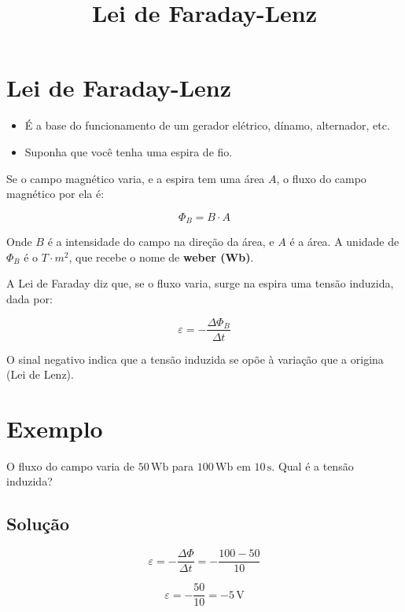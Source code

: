 \documentclass[a4paper,12pt]{article}
\title{Lei de Faraday-Lenz}
\author{}
\date{}
\begin{document}
\maketitle

\section*{Lei de Faraday-Lenz}

\begin{itemize}
    \item É a base do funcionamento de um gerador elétrico, dínamo, alternador, etc.
    \item Suponha que você tenha uma espira de fio.
\end{itemize}

Se o campo magnético varia, e a espira tem uma área $A$, o fluxo do campo magnético por ela é:

\[
\Phi_B = B \cdot A
\]

Onde $B$ é a intensidade do campo na direção da área, e $A$ é a área.  
A unidade de $\Phi_B$ é o $T \cdot m^2$, que recebe o nome de \textbf{weber (Wb)}.

A Lei de Faraday diz que, se o fluxo varia, surge na espira uma tensão induzida, dada por:

\[
\varepsilon = - \frac{\Delta \Phi_B}{\Delta t}
\]

O sinal negativo indica que a tensão induzida se opõe à variação que a origina (Lei de Lenz).

\section*{Exemplo}

O fluxo do campo varia de $50\,\text{Wb}$ para $100\,\text{Wb}$ em $10\,\text{s}$.  
Qual é a tensão induzida?

\subsection*{Solução}

\[
\varepsilon = -\frac{\Delta \Phi}{\Delta t} = -\frac{100 - 50}{10}
\]

\[
\varepsilon = -\frac{50}{10} = -5 \,\text{V}
\]
\end{document}
